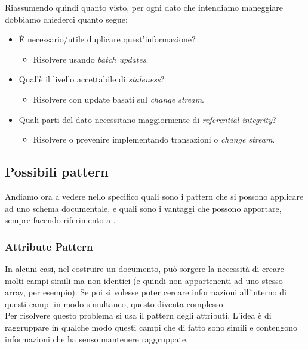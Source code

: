 \noindent Riassumendo quindi quanto visto, per ogni dato che intendiamo maneggiare dobbiamo chiederci quanto segue:
\begin{itemize}
    \item È necessario/utile duplicare quest'informazione?
    \begin{itemize}
        \item Risolvere usando \textit{batch updates}.
    \end{itemize}
    \item Qual'è il livello accettabile di \textit{staleness}?
    \begin{itemize}
        \item Risolvere con update basati sul \textit{\gls{change stream}}.
    \end{itemize}
    \item Quali parti del dato necessitano maggiormente di \textit{referential integrity}?
    \begin{itemize}
        \item Risolvere o prevenire implementando transazioni o \textit{\gls{change stream}}.
    \end{itemize}
\end{itemize}

\subsection{Possibili pattern}
Andiamo ora a vedere nello specifico quali sono i pattern che si possono applicare ad uno schema documentale, e quali sono i vantaggi che possono apportare, sempre facendo riferimento a \cite{site:mongoDataModeling}.

\subsubsection{Attribute Pattern}
In alcuni casi, nel costruire un documento, può sorgere la necessità di creare molti campi simili ma non identici (e quindi non appartenenti ad uno stesso array, per esempio). Se poi si volesse poter cercare informazioni all'interno di questi campi in modo simultaneo, questo diventa complesso.\\
Per risolvere questo problema si usa il pattern degli attributi. L'idea è di raggruppare in qualche modo questi campi che di fatto sono simili e contengono informazioni che ha senso mantenere raggruppate.\\

